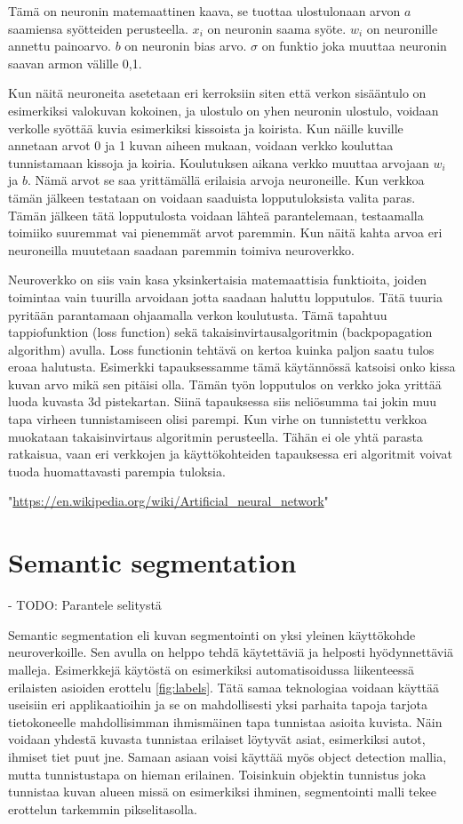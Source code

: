 Tämä on neuronin matemaattinen kaava,
se tuottaa ulostulonaan arvon \(a\) saamiensa syötteiden perusteella.
\(x_i\) on neuronin saama syöte.
\(w_i\) on neuronille annettu painoarvo.
\(b\) on neuronin bias arvo. \(\sigma\) on funktio joka muuttaa neuronin saavan armon välille 0,1.

Kun näitä neuroneita asetetaan eri kerroksiin siten että verkon sisääntulo on esimerkiksi valokuvan kokoinen, ja ulostulo on yhen neuronin ulostulo, voidaan verkolle syöttää kuvia esimerkiksi kissoista ja koirista. Kun näille kuville annetaan arvot 0 ja 1 kuvan aiheen mukaan, voidaan verkko kouluttaa tunnistamaan kissoja ja koiria. Koulutuksen aikana verkko muuttaa arvojaan \(w_i\) ja \(b\). Nämä arvot se saa yrittämällä erilaisia arvoja neuroneille. Kun verkkoa tämän jälkeen testataan on voidaan saaduista lopputuloksista valita paras. Tämän jälkeen tätä lopputulosta voidaan lähteä parantelemaan, testaamalla toimiiko suuremmat vai pienemmät arvot paremmin. Kun näitä kahta arvoa eri neuroneilla muutetaan saadaan paremmin toimiva neuroverkko.

Neuroverkko on siis vain kasa yksinkertaisia matemaattisia funktioita, joiden toimintaa vain tuurilla arvoidaan jotta saadaan haluttu lopputulos. Tätä tuuria pyritään parantamaan ohjaamalla verkon koulutusta. Tämä tapahtuu tappiofunktion (loss function) sekä takaisinvirtausalgoritmin (backpopagation algorithm) avulla. Loss functionin tehtävä on kertoa kuinka paljon saatu tulos eroaa halutusta. Esimerkki tapauksessamme tämä käytännössä katsoisi onko kissa kuvan arvo mikä sen pitäisi olla. Tämän työn lopputulos on verkko joka yrittää luoda kuvasta 3d pistekartan. Siinä tapauksessa siis neliösumma tai jokin muu tapa virheen tunnistamiseen olisi parempi. Kun virhe on tunnistettu verkkoa muokataan takaisinvirtaus algoritmin perusteella. Tähän ei ole yhtä parasta ratkaisua, vaan eri verkkojen ja käyttökohteiden tapauksessa eri algoritmit voivat tuoda huomattavasti parempia tuloksia.

"\url{https://en.wikipedia.org/wiki/Artificial_neural_network}"

\section{Semantic segmentation}

- TODO: Parantele selitystä

Semantic segmentation eli kuvan segmentointi on yksi yleinen käyttökohde neuroverkoille.
Sen avulla on helppo tehdä käytettäviä ja helposti hyödynnettäviä malleja.
Esimerkkejä käytöstä on esimerkiksi automatisoidussa liikenteessä erilaisten asioiden erottelu \ref{fig:labels}.
Tätä samaa teknologiaa voidaan käyttää useisiin eri applikaatioihin ja se on mahdollisesti yksi parhaita tapoja tarjota tietokoneelle mahdollisimman ihmismäinen tapa tunnistaa asioita kuvista. Näin voidaan yhdestä kuvasta tunnistaa erilaiset löytyvät asiat, esimerkiksi autot, ihmiset tiet puut jne. Samaan asiaan voisi käyttää myös object detection mallia, mutta tunnistustapa on hieman erilainen. Toisinkuin objektin tunnistus joka tunnistaa kuvan alueen missä on esimerkiksi ihminen, segmentointi malli tekee erottelun tarkemmin pikselitasolla.

